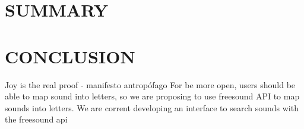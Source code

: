 \documentclass{aes2e}
\begin{document}
\begin{extract}





\section{SUMMARY}


\section{CONCLUSION}
Joy is the real proof - manifesto antropófago
For be more open, users should be able to map sound into letters, so we are proposing to use freesound API to map sounds into letters. We are corrent developing an interface to search sounds with the freesound api 



\end{extract}
\end{document}
